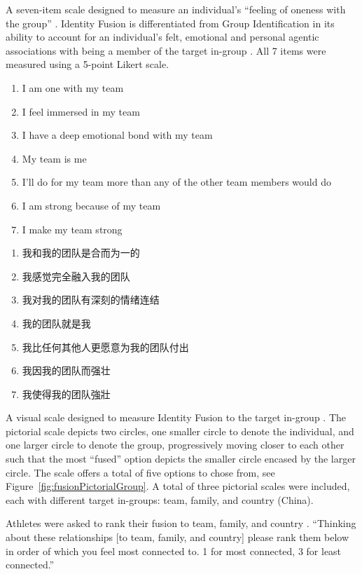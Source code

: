 \begin{CJK}{UTF8}{gbsn}
\begin{description}[labelindent=1cm]
  \item [Identity Fusion Verbal] A seven-item scale designed to measure an individual's ``feeling of oneness with the group'' \citep{Swann2009}.  Identity Fusion is differentiated from Group Identification in its ability to account for an individual's felt, emotional and personal agentic associations with being a member of the target in-group \citep{Swann2012a}.  All 7 items were measured using a 5-point Likert scale.
    \begin{enumerate}
      \item I am one with my team
      \item I feel immersed in my team
      \item I have a deep emotional bond with my team
      \item My team is me
      \item I’ll do for my team more than any of the other team members would do
      \item I am strong because of my team
      \item I make my team strong
    \end{enumerate}
    \begin{enumerate}
      \item 我和我的团队是合而为一的
      \item 我感觉完全融入我的团队
      \item 我对我的团队有深刻的情绪连结
      \item 我的团队就是我
      \item 我比任何其他人更愿意为我的团队付出
      \item 我因我的团队而强壮
      \item 我使得我的团队強壯
    \end{enumerate}
  \item [Identity Fusion Pictorial] A visual scale designed to measure Identity Fusion to the target in-group \citep{Swann2009}. The pictorial scale depicts two circles, one smaller circle to denote the individual, and one larger circle to denote the group, progressively moving closer to each other such that the most ``fused'' option depicts the smaller circle encased by the larger circle. The scale offers a total of five options to chose from, see Figure~\ref{fig:fusionPictorialGroup}.  A total of three pictorial scales were included, each with different target in-groups: team, family, and country (China).
  \item [Fusion Pictorial Rank] Athletes were asked to rank their fusion to team, family, and country \citep{Whitehouse2014}.  ``Thinking about these relationships [to team, family, and country] please rank them below in order of which you feel most connected to. 1 for most connected, 3 for least connected.''
  \end{description}



\end{CJK}
